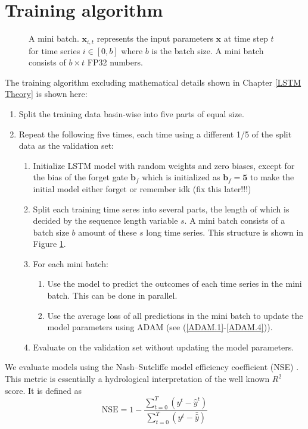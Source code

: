 \section{Training algorithm}
\begin{figure}
\centering

    \caption[A mini batch.]{A mini batch. $\bm{x}_{i,t}$ represents the input parameters $\bm{x}$ at time step $t$ for time series $i \in [0, b]$ where $b$ is the batch size. A mini batch consists of $b \times t$ FP32 numbers.}
\label{mini batch}
\end{figure}
The training algorithm excluding mathematical details shown in Chapter \ref{LSTM Theory} 
is shown here:
\begin{enumerate}
    \item Split the training data basin-wise into five parts of equal size.
    \item Repeat the following five times, each time using a different 1/5 of the 
        split data as the validation set: \begin{enumerate}
            \item Initialize LSTM model with random weights and zero biases, except for the bias of the forget gate $\bm{b}_f$ which is initialized as $\bm{b}_f=\bm{5}$ to make the initial model either forget or remember idk (fix this later!!!) \citationneeded
        \item Split each training time seres into several parts, the length 
            of which is decided by the sequence length variable $s$. A mini batch 
            consists of a batch size $b$ amount of these $s$ long time series. This 
                structure is shown in Figure \ref{mini batch}.
        \item For each mini batch:
        \begin{enumerate}
            \item Use the model to predict the outcomes of each time series in the 
                mini batch. This can be done in parallel.
            \item Use the average loss of all predictions in the mini batch to update 
                the model parameters using ADAM (see (\ref{ADAM.1}-\ref{ADAM.4})).
        \end{enumerate}
        \item Evaluate on the validation set without updating the model parameters.
    \end{enumerate}
\end{enumerate}
We evaluate models using the Nash–Sutcliffe model efficiency coefficient (NSE) \citep{NSE}.
This metric is essentially a hydrological interpretation of the well known $R^2$ score.
It is defined as 
\begin{equation}
    \text{NSE} = 1 - \frac{\sum_{t=0}^T\left( y^t - \hat{y}^t\right)}{\sum_{t=0}^T\left(y^t - \bar{\hat{y}}\right)} \label{NSE}
\end{equation}

